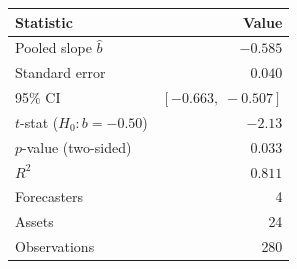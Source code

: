 \begin{tabular}{lr}
\toprule
Statistic & Value \\
\midrule
  Pooled slope $\hat{b}$ & $-0.585$ \\
  Standard error & $0.040$ \\
  95\% CI & $[-0.663,\;-0.507]$ \\
  $t$-stat ($H_0\colon b = -0.50$) & $-2.13$ \\
  $p$-value (two-sided) & $0.033$ \\
  $R^2$ & $0.811$ \\
  Forecasters & 4 \\
  Assets & 24 \\
  Observations & 280 \\
\bottomrule
\end{tabular}